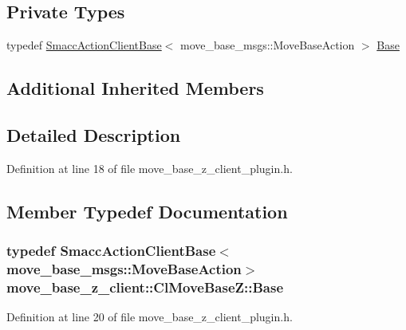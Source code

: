 \subsection*{Private Types}
\begin{DoxyCompactItemize}
\item 
typedef \hyperlink{classsmacc_1_1client__bases_1_1SmaccActionClientBase_af38f27dd26f8a87fea6b3eaa4a84e604}{Smacc\+Action\+Client\+Base}$<$ move\+\_\+base\+\_\+msgs\+::\+Move\+Base\+Action $>$ \hyperlink{classmove__base__z__client_1_1ClMoveBaseZ_a5446f4fb56caf7c8de8dd3bd34ae64d6}{Base}
\end{DoxyCompactItemize}
\subsection*{Additional Inherited Members}


\subsection{Detailed Description}


Definition at line 18 of file move\+\_\+base\+\_\+z\+\_\+client\+\_\+plugin.\+h.



\subsection{Member Typedef Documentation}
\subsubsection[{\texorpdfstring{Base}{Base}}]{\setlength{\rightskip}{0pt plus 5cm}typedef {\bf Smacc\+Action\+Client\+Base}$<$move\+\_\+base\+\_\+msgs\+::\+Move\+Base\+Action$>$ {\bf move\+\_\+base\+\_\+z\+\_\+client\+::\+Cl\+Move\+Base\+Z\+::\+Base}\hspace{0.3cm}{\ttfamily [private]}}\hypertarget{classmove__base__z__client_1_1ClMoveBaseZ_a5446f4fb56caf7c8de8dd3bd34ae64d6}{}\label{classmove__base__z__client_1_1ClMoveBaseZ_a5446f4fb56caf7c8de8dd3bd34ae64d6}


Definition at line 20 of file move\+\_\+base\+\_\+z\+\_\+client\+\_\+plugin.\+h.

